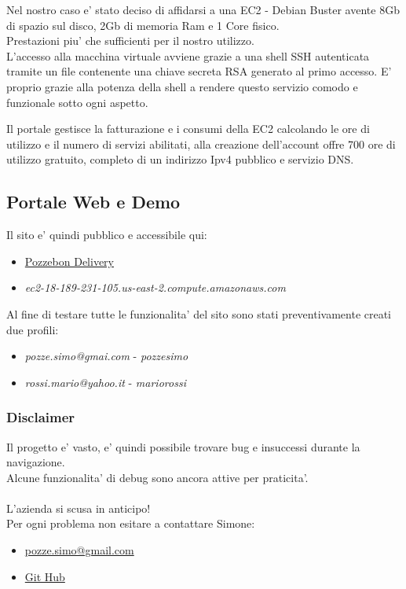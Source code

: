 \documentclass[a4paper, 12pt]{report}
\begin{document}
Nel nostro caso e' stato deciso di affidarsi a una EC2 - Debian Buster avente 8Gb di spazio sul disco, 2Gb di memoria Ram e 1 Core fisico. \\ 
Prestazioni piu' che sufficienti per il nostro utilizzo. \\ L'accesso alla macchina virtuale avviene grazie a una shell SSH autenticata tramite un file contenente una chiave secreta RSA generato al primo accesso.
E' proprio grazie alla potenza della shell a rendere questo servizio comodo e funzionale sotto ogni aspetto.

Il portale gestisce la fatturazione e i consumi della EC2 calcolando le ore di utilizzo e il numero di servizi abilitati, 
alla creazione dell'account offre 700 ore di utilizzo gratuito, completo di un indirizzo Ipv4 pubblico e servizio DNS.

\subsection{Portale Web e Demo}
Il sito e' quindi pubblico e accessibile qui:
\begin{itemize}
    \item \href{https://ec2-18-189-231-105.us-east-2.compute.amazonaws.com}{Pozzebon Delivery}
    \item \textit{ec2-18-189-231-105.us-east-2.compute.amazonaws.com}
\end{itemize}

Al fine di testare tutte le funzionalita' del sito sono stati  preventivamente creati due profili:
\begin{itemize}
    \item \textit{pozze.simo@gmai.com} - \textit{pozzesimo}
    \item \textit{rossi.mario@yahoo.it} - \textit{mariorossi}
\end{itemize}

\subsubsection{\textbf{Disclaimer}}
Il progetto e' vasto, e' quindi possibile trovare  bug e insuccessi durante la navigazione. \\
Alcune funzionalita’ di debug sono ancora attive per praticita'.\\ \\
L'azienda si scusa in anticipo! \\ Per ogni problema non esitare a contattare Simone:
\begin{itemize}
    \item \href{mailto:pozze.simo@gmai.com}{pozze.simo@gmail.com}
    \item \href{https://github.com/simopozze}{Git Hub}
\end{itemize}
\end{document}

